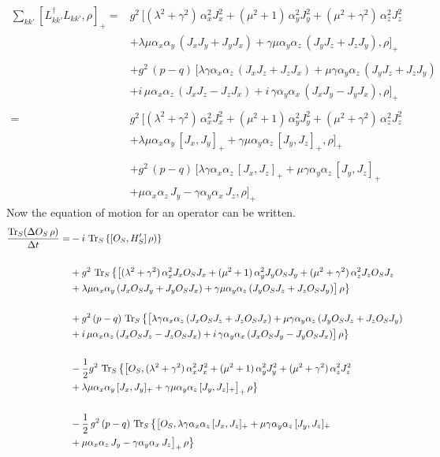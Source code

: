 \documentclass{article}
\begin{document}
\begin{align*}
    \sum_{kk'}\left[L_{kk'}^\dagger L_{kk'},\rho\right]_+=&g^2\,\big[(\lambda^2+\gamma^2)\,\alpha_x^2J_x^2+(\mu^2+1)\,\alpha_y^2 J_y^2+(\mu^2+\gamma^2)\,\alpha_z^2 J_z^2\\
    &+\lambda\mu\alpha_x\alpha_y\,(J_x J_y + J_y J_x)+\gamma\mu\alpha_y\alpha_z\,(J_y  J_z + J_z  J_y),\rho\big]_+\\\\
    &+g^2\,(p-q)\,\big[\lambda\gamma\alpha_x\alpha_z\,(J_x J_z+J_z  J_x)+\mu\gamma\alpha_y\alpha_z\,(J_y J_z+J_z J_y)\\
    &+i\,\mu\alpha_x\alpha_z\,(J_x J_z-J_z  J_x)+i\,\gamma\alpha_y\alpha_x\,(J_x  J_y-J_y  J_x),\rho\big]_+\\\\
    =&g^2\,\big[(\lambda^2+\gamma^2)\,\alpha_x^2J_x^2+(\mu^2+1)\,\alpha_y^2 J_y^2+(\mu^2+\gamma^2)\,\alpha_z^2 J_z^2\\
                &+\lambda\mu\alpha_x\alpha_y\,[J_x, J_y]_+ +\gamma\mu\alpha_y\alpha_z\,[J_y,  J_z]_+,\rho\big]_+\\\\
    &+g^2\,(p-q)\,\big[\lambda\gamma\alpha_x\alpha_z\,[J_x, J_z]_+ + \mu\gamma\alpha_y\alpha_z\,[J_y, J_z]_+\\
    &+\mu\alpha_x\alpha_z\,J_y-\gamma\alpha_y\alpha_x\,J_z,\rho\big]_+
\end{align*}
Now the equation of motion for an operator can be written. 
\begin{align*}
     \frac{\operatorname{Tr}_S(\Delta O_S\,\rho)}{\Delta t} =&
    -i\,\operatorname{Tr}_S\left\{[O_S,H_S']\,\rho)\right\}\\\\
    &+g^2\,\operatorname{Tr}_S\big\{\big[(\lambda^2+\gamma^2)\,\alpha_x^2J_xO_S J_x+(\mu^2+1)\,\alpha_y^2 J_y O_S J_y+(\mu^2+\gamma^2)\,\alpha_z^2 J_z O_S J_z\\
    &+\lambda\mu\alpha_x\alpha_y\,(J_x O_S J_y + J_y O_S J_x)+\gamma\mu\alpha_y\alpha_z\,(J_y O_S J_z + J_z O_S J_y)\big]\,\rho\big\}\\\\
    &+g^2\,(p-q)\,\operatorname{Tr}_S\big\{\big[\lambda\gamma\alpha_x\alpha_z\,(J_x O_S J_z+J_z O_S J_x)+\mu\gamma\alpha_y\alpha_z\,(J_y O_S J_z+J_z O_S J_y)\\
    &+i\,\mu\alpha_x\alpha_z\,(J_x O_S J_z-J_z O_S J_x)+i\,\gamma\alpha_y\alpha_x\,(J_x O_S J_y-J_y O_S J_x)\big]\,\rho\big\}\\\\
    &-\frac{1}{2} g^2\,\operatorname{Tr}_S\big\{\big[O_S,(\lambda^2+\gamma^2)\,\alpha_x^2J_x^2+(\mu^2+1)\,\alpha_y^2 J_y^2+(\mu^2+\gamma^2)\,\alpha_z^2 J_z^2\\
                &+\lambda\mu\alpha_x\alpha_y\,[J_x, J_y]_+ +\gamma\mu\alpha_y\alpha_z\,[J_y,  J_z]_+\big]_+\,\rho\big\}\\\\
    &-\frac{1}{2}\,g^2\,(p-q)\,\operatorname{Tr}_S\big\{\big[O_S,\lambda\gamma\alpha_x\alpha_z\,[J_x, J_z]_+ + \mu\gamma\alpha_y\alpha_z\,[J_y, J_z]_+\\
    &+\mu\alpha_x\alpha_z\,J_y-\gamma\alpha_y\alpha_x\,J_z\big]_+\,\rho\big\}
\end{align*}
\end{document}
